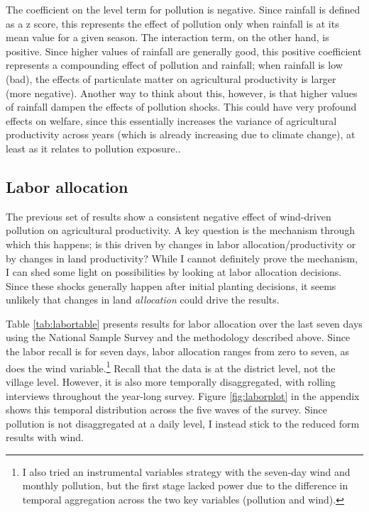 \documentclass[
]{article}
\begin{document}
The coefficient on the level term for pollution is negative. Since rainfall is defined as a z score, this represents the effect of pollution only when rainfall is at its mean value for a given season. The interaction term, on the other hand, is positive. Since higher values of rainfall are generally good, this positive coefficient represents a compounding effect of pollution and rainfall; when rainfall is low (bad), the effects of particulate matter on agricultural productivity is larger (more negative). Another way to think about this, however, is that higher values of rainfall dampen the effects of pollution shocks. This could have very profound effects on welfare, since this essentially increases the variance of agricultural productivity across years (which is already increasing due to climate change), at least as it relates to pollution exposure..

\hypertarget{labor-allocation}{%
\subsection{Labor allocation}\label{labor-allocation}}

The previous set of results show a consistent negative effect of wind-driven pollution on agricultural productivity. A key question is the mechanism through which this happens; is this driven by changes in labor allocation/productivity or by changes in land productivity? While I cannot definitely prove the mechanism, I can shed some light on possibilities by looking at labor allocation decisions. Since these shocks generally happen after initial planting decisions, it seems unlikely that changes in land \emph{allocation} could drive the results.

Table \ref{tab:labortable} presents results for labor allocation over the last seven days using the National Sample Survey and the methodology described above. Since the labor recall is for seven days, labor allocation ranges from zero to seven, as does the wind variable.\footnote{I also tried an instrumental variables strategy with the seven-day wind and monthly pollution, but the first stage lacked power due to the difference in temporal aggregation across the two key variables (pollution and wind).} Recall that the data is at the district level, not the village level. However, it is also more temporally disaggregated, with rolling interviews throughout the year-long survey. Figure \ref{fig:laborplot} in the appendix shows this temporal distribution across the five waves of the survey. Since pollution is not disaggregated at a daily level, I instead stick to the reduced form results with wind.
\end{document}
